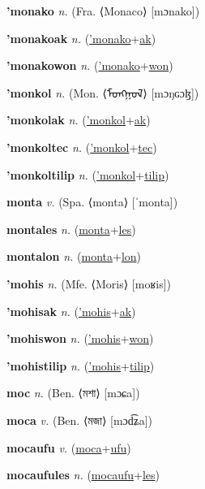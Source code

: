\textbf{\hypertarget{'monako}{'monako}} \textit{n.} (Fra. ⟨Monaco⟩ [mɔnako])


\textbf{\hypertarget{'monakoak}{'monakoak}} \textit{n.} (\hyperlink{'monako}{'monako}+\allowbreak \hyperlink{ak}{ak})


\textbf{\hypertarget{'monakowon}{'monakowon}} \textit{n.} (\hyperlink{'monako}{'monako}+\allowbreak \hyperlink{won}{won})


\textbf{\hypertarget{'monkol}{'monkol}} \textit{n.} (Mon. ⟨{\mongolian{}ᠮᠣᠩᠭᠣᠯ}⟩ [mɔŋɢɔɮ])


\textbf{\hypertarget{'monkolak}{'monkolak}} \textit{n.} (\hyperlink{'monkol}{'monkol}+\allowbreak \hyperlink{ak}{ak})


\textbf{\hypertarget{'monkoltec}{'monkoltec}} \textit{n.} (\hyperlink{'monkol}{'monkol}+\allowbreak \hyperlink{tec}{tec})


\textbf{\hypertarget{'monkoltilip}{'monkoltilip}} \textit{n.} (\hyperlink{'monkol}{'monkol}+\allowbreak \hyperlink{tilip}{tilip})


\textbf{\hypertarget{monta}{monta}} \textit{v.} (Spa. ⟨monta⟩ [ˈmonta])


\textbf{\hypertarget{montales}{montales}} \textit{n.} (\hyperlink{monta}{monta}+\allowbreak \hyperlink{les}{les})


\textbf{\hypertarget{montalon}{montalon}} \textit{n.} (\hyperlink{monta}{monta}+\allowbreak \hyperlink{lon}{lon})


\textbf{\hypertarget{'mohis}{'mohis}} \textit{n.} (Mfe. ⟨Moris⟩ [moʁis])


\textbf{\hypertarget{'mohisak}{'mohisak}} \textit{n.} (\hyperlink{'mohis}{'mohis}+\allowbreak \hyperlink{ak}{ak})


\textbf{\hypertarget{'mohiswon}{'mohiswon}} \textit{n.} (\hyperlink{'mohis}{'mohis}+\allowbreak \hyperlink{won}{won})


\textbf{\hypertarget{'mohistilip}{'mohistilip}} \textit{n.} (\hyperlink{'mohis}{'mohis}+\allowbreak \hyperlink{tilip}{tilip})


\textbf{\hypertarget{moc}{moc}} \textit{n.} (Ben. ⟨{\bengali{}মশা}⟩ [mɔɕa])


\textbf{\hypertarget{moca}{moca}} \textit{v.} (Ben. ⟨{\bengali{}মজা}⟩ [mɔd͡ʑa])


\textbf{\hypertarget{mocaufu}{mocaufu}} \textit{v.} (\hyperlink{moca}{moca}+\allowbreak \hyperlink{ufu}{ufu})


\textbf{\hypertarget{mocaufules}{mocaufules}} \textit{n.} (\hyperlink{mocaufu}{mocaufu}+\allowbreak \hyperlink{les}{les})


